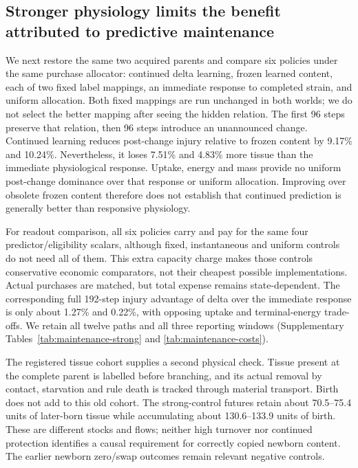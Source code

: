 \subsection*{Stronger physiology limits the benefit attributed to predictive maintenance}

We next restore the same two acquired parents and compare six policies under the same purchase allocator: continued delta learning, frozen learned content, each of two fixed label mappings, an immediate response to completed strain, and uniform allocation. Both fixed mappings are run unchanged in both worlds; we do not select the better mapping after seeing the hidden relation. The first 96 steps preserve that relation, then 96 steps introduce an unannounced change. Continued learning reduces post-change injury relative to frozen content by 9.17\% and 10.24\%. Nevertheless, it loses 7.51\% and 4.83\% more tissue than the immediate physiological response. Uptake, energy and mass provide no uniform post-change dominance over that response or uniform allocation. Improving over obsolete frozen content therefore does not establish that continued prediction is generally better than responsive physiology.

For readout comparison, all six policies carry and pay for the same four predictor/eligibility scalars, although fixed, instantaneous and uniform controls do not need all of them. This extra capacity charge makes those controls conservative economic comparators, not their cheapest possible implementations. Actual purchases are matched, but total expense remains state-dependent. The corresponding full 192-step injury advantage of delta over the immediate response is only about 1.27\% and 0.22\%, with opposing uptake and terminal-energy trade-offs. We retain all twelve paths and all three reporting windows (Supplementary Tables~\ref{tab:maintenance-strong} and \ref{tab:maintenance-costs}).

The registered tissue cohort supplies a second physical check. Tissue present at the complete parent is labelled before branching, and its actual removal by contact, starvation and rule death is tracked through material transport. Birth does not add to this old cohort. The strong-control futures retain about 70.5--75.4 units of later-born tissue while accumulating about 130.6--133.9 units of birth. These are different stocks and flows; neither high turnover nor continued protection identifies a causal requirement for correctly copied newborn content. The earlier newborn zero/swap outcomes remain relevant negative controls.

